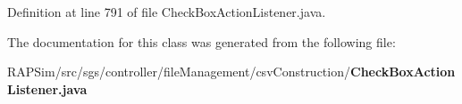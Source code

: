 Definition at line 791 of file Check\-Box\-Action\-Listener.\-java.



The documentation for this class was generated from the following file\-:\begin{DoxyCompactItemize}
\item 
R\-A\-P\-Sim/src/sgs/controller/file\-Management/csv\-Construction/{\bf Check\-Box\-Action\-Listener.\-java}\end{DoxyCompactItemize}
